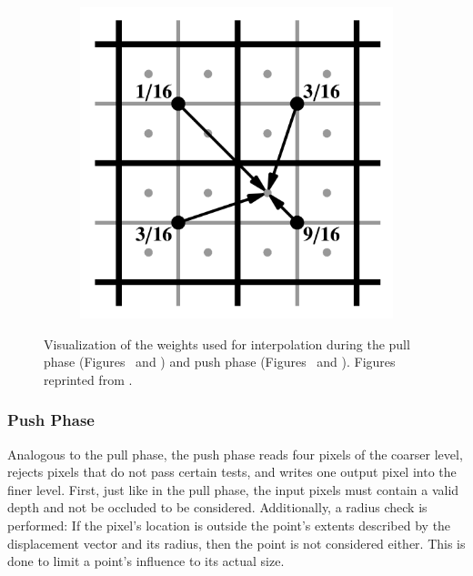 \begin{figure}[htb]
\begin{subfigure}[b]{0.25\textwidth}
    \caption{\label{fig:concept:weights_marroquim3}}
  \end{subfigure}%
  \begin{subfigure}[b]{0.25\textwidth}
    \centering\includegraphics[width=\textwidth]{graphics/push_weights_marroquim2}
    \caption{\label{fig:concept:weights_marroquim4}}
  \end{subfigure}
  \caption{Visualization of the weights used for interpolation during the pull phase (Figures~  and ) and push phase (Figures~ and ). Figures reprinted from \citet{Marroquim:2007:reconstruction}.}
  \label{fig:concept:weights_marroquim}
\end{figure}



\subsubsection{Push Phase}

Analogous to the pull phase, the push phase reads four pixels of the coarser level, rejects pixels that do not pass certain tests, and writes one output pixel into the finer level. First, just like in the pull phase, the input pixels must contain a valid depth and not be occluded to be considered. Additionally, a radius check is performed: If the pixel's location is outside the point's extents described by the displacement vector and its radius, then the point is not considered either. This is done to limit a point's influence to its actual size.

